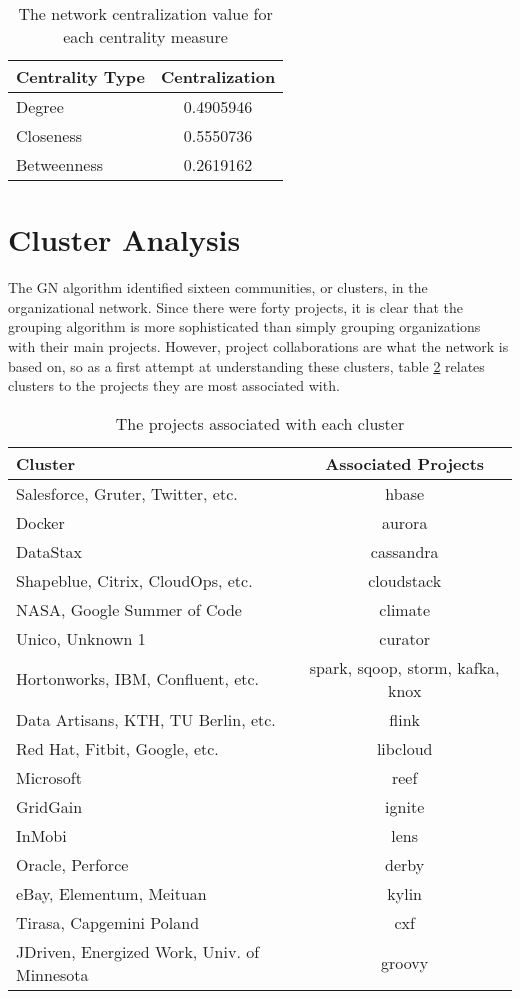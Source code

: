 \begin{table}
	\begin{tabular}{l|c}
		\bfseries Centrality Type & \bfseries Centralization \\
		\hline
		Degree & 0.4905946 \\
		\hline
		Closeness & 0.5550736 \\
		\hline
		Betweenness & 0.2619162
	\end{tabular}
	\centering
	\caption{The network centralization value for each centrality measure}\label{tab:centralization}
\end{table}

\section{Cluster Analysis}\label{clustersection}
The GN algorithm identified sixteen communities, or clusters, in the organizational network. Since there were forty projects, it is clear that the grouping algorithm is more sophisticated than simply grouping organizations with their main projects. However, project collaborations are what the network is based on, so as a first attempt at understanding these clusters, table \ref{tab:clusterprojects} relates clusters to the projects they are most associated with.

\begin{table}
	\begin{tabular}{l|c}
		\bfseries Cluster & \bfseries Associated Projects \\
		\hline
		Salesforce, Gruter, Twitter, etc. & hbase \\
		Docker & aurora \\
		DataStax & cassandra \\
		Shapeblue, Citrix, CloudOps, etc. & cloudstack \\
		NASA, Google Summer of Code & climate \\
		Unico, Unknown 1 & curator \\
		Hortonworks, IBM, Confluent, etc. & spark, sqoop, storm, kafka, knox \\
		Data Artisans, KTH, TU Berlin, etc. & flink \\
		Red Hat, Fitbit, Google, etc. & libcloud \\
		Microsoft & reef \\
		GridGain & ignite \\
		InMobi & lens \\
		Oracle, Perforce & derby \\
		eBay, Elementum, Meituan & kylin \\
		Tirasa, Capgemini Poland & cxf \\
		JDriven, Energized Work, Univ. of Minnesota & groovy
	\end{tabular}
	\caption{The projects associated with each cluster}\label{tab:clusterprojects}
\end{table}

